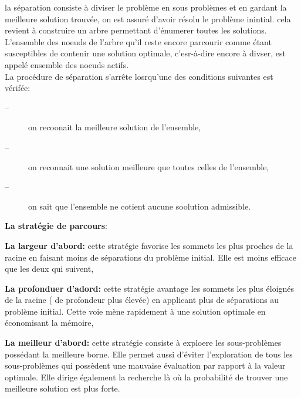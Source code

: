 \documentclass[a4paper,11pt,oneside]{report}
\theoremstyle{plain}
\newcommand{\0}{/ \! \! \! 0}
\theoremstyle{plain}
\begin{document}
 \begin{description}
 \item la s\'eparation consiste \`a diviser le probl\`eme en sous probl\`emes et en gardant la meilleure solution trouv\'ee, on est assur\'e d'avoir r\'esolu
  le probl\`eme inintial. cela revient \`a construire un arbre permettant d'\'enumerer toutes les solutions. L'ensemble des noeuds de l'arbre qu'il reste
  encore parcourir comme \'etant susceptibles de contenir une solution optimale, c'esr-\`a-dire encore \`a divser, est appel\'e ensemble des noeuds actifs.\\
  La proc\'edure de s\'eparation s'arr\^ete losrqu'une des conditions suivantes est v\'erif\'ee:
  \begin{description}
   \item[--] on recoonait la meilleure solution de l'ensemble,
   \item[--] on reconnait une solution meilleure que toutes celles de l'ensemble,
   \item[--] on sait que l'ensemble ne cotient aucune soolution admissible.
  \end{description}
 \end{description}
 {\bf La strat\'egie de parcours}:
 \begin{description}
  \item {\bf La largeur d'abord:} cette strat\'egie favorise les sommets les plus proches de la racine en faisant moins de s\'eparations du probl\`eme 
  initial. Elle est moins efficace que les deux qui suivent, 
  \item {\bf La profonduer d'adord:} cette strat\'egie avantage les sommets les plus \'eloign\'es de la racine ( de profondeur plus \'elev\'ee) en applicant
   plus de s\'eparations au probl\`eme initial. Cette voie m\`ene rapidement \`a une solution optimale en \'economisant la m\'emoire,
  \item {\bf La meilleur d'abord:} cette strat\'egie consiste \`a exploere les sous-probl\`emes poss\'edant la meilleure borne. Elle permet aussi d'\'eviter l'exploration
   de tous les sous-probl\`emes qui poss\`edent une mauvaise \'evaluation par rapport \`a la valeur optimale. Elle dirige \'egalement la recherche l\`a o\`u
    la probabilit\'e de trouver une meilleure solution est plus forte.
 \end{description}
\end{document}
